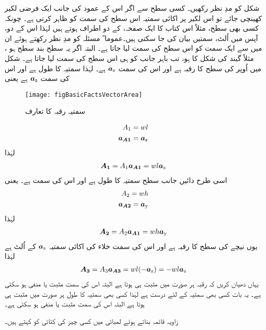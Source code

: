 شکل  کو مدِ نظر رکھیں۔ کسی سطح سے اگر اس کے عمود کی جانب ایک فرضی لکیر کھینچی جائے تو اس  لکیر پر اکائی سمتیہ اس سطح کی سمت کو ظاہر کرتی ہے۔ چونکہ کسی بھی سطح، مثلاً اس کتاب کا ایک صفحہ،  کے دو اطراف ہوتے ہیں لہٰذا اس کے دو،  آپس میں اُلٹ،  سمتیں بیان کی جا سکتی ہیں۔عموما ً مسئلہ کو مدِ نظر رکھتے ہوئے  ان میں سے ایک سمت کو اس سطح کی سمت  لیا جاتا ہے۔ البتہ اگر یہ سطح بند سطح ہو ، مثلاً  گیند کی شکل کا ہو،  تب باہر جانب کو ہی اس سطح کی سمت لیا جاتا ہے۔ شکل میں اُوپر کی سطح   کا رقبہ  ہے اور اس کی سمت ${\boldsymbol{a}}_{\textup{z}}$ ہے۔ لہٰذا   سمتیہ کا طول   ہے اور اس کی سمت ${\boldsymbol{a}}_{\textup{z}}$ ہے یعنی
\begin{figure}
\centering
\texttt{[image: figBasicFactsVectorArea]}
\caption{سمتیہ رقبہ کا تعارف‬}
\label{شکل_حقائق_رقبہ_سمتیہ}
\end{figure}
%
\begin{align*}
A_1&=wl\\
{{\boldsymbol{a_{A1}}}}&={\boldsymbol{a}}_{\textup{z}}
\end{align*}
لہٰذا
\begin{align}
{\ensuremath{{\boldsymbol{A_1}}}}=A_1 {{\boldsymbol{a_{A1}}}}= w l {\boldsymbol{a}}_{\textup{z}}
\end{align}
اسی طرح دائیں جانب سطح  سمتیہ  کا طول  ہے اور اس کی سمت  ہے۔ یعنی
\begin{align*}
A_2=wh\\
{{\boldsymbol{a_{A2}}}}={\boldsymbol{a}}_{\textup{y}}
\end{align*}
لہٰذا
\begin{align}
{\ensuremath{{\boldsymbol{A_2}}}}=A_2 {{\boldsymbol{a_{A1}}}}=w h {\boldsymbol{a}}_{\textup{y}}
\end{align}
یوں نیچے کی سطح کا رقبہ  ہے اور اس کی سمت خلاء کی  اکائی سمتیہ ${\boldsymbol{a}}_{\textup{z}}$ کے اُلٹ ہے لہٰذا
\begin{align}
{\ensuremath{{\boldsymbol{A_3}}}}=A_3 {{\boldsymbol{a_{A3}}}}=wl (-{\boldsymbol{a}}_{\textup{z}})=-wl {\boldsymbol{a}}_{\textup{z}}
\end{align}
یہاں دھیان کریں کہ رقبہ ہر صورت میں مثبت ہی ہوتا ہے البتہ اس کی سمت مثبت یا منفی ہو سکتی ہے۔ یہ بات کسی بھی سمتیہ کے لئے درست ہے لہٰذا کسی بھی سمتیہ کا طول ہر صورت میں مثبت ہی ہوتا ہے البتہ اس کی سمت مثبت یا منفی ہو سکتی ہے۔

زاویہ قائمہ بناتے ہوئے لمبائی میں کسی چیز کی کٹائی کو  کہتے ہیں۔	

